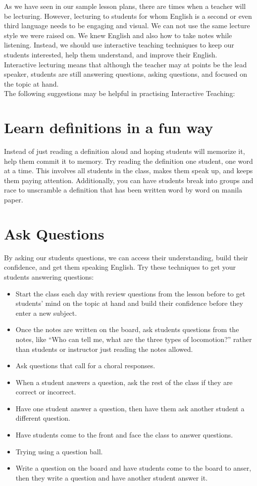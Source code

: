 As we have seen in our sample lesson plans, there are times when a teacher will be lecturing.  However, lecturing to students for whom English is a second or even third language needs to be engaging and visual.  We can not use the same lecture style we were raised on. We knew English and also how to take notes while listening. Instead, we should use interactive teaching techniques to keep our students interested, help them  understand, and improve their English. \\

Interactive lecturing means that although the teacher may at points be the lead speaker, students are still answering questions, asking questions, and focused on the topic at hand.\\

The following suggestions may be helpful in practising Interactive Teaching:

\section{Learn definitions in a fun way}
Instead of just reading a definition aloud and hoping students will memorize it, help them commit it to memory.  Try reading the definition one student, one word at a time.  This involves all students in the class, makes them speak up, and keeps them paying attention.  Additionally, you can have students break into groups and race to unscramble a definition that has been written word by word on manila paper.\\

\section{Ask Questions}
By asking our students questions, we can access their understanding, build their confidence, and get them speaking English. Try these techniques to get your students answering questions:
\begin{itemize}
\item Start the class each day with review questions from the lesson before to get students' mind on the topic at hand and build their confidence before they enter a new subject.
\item Once the notes are written on the board, ask students questions from the notes, like ``Who can tell me, what are the three types of locomotion?'' rather than students or instructor just reading the notes allowed.
\item Ask questions that call for a choral responses.
\item When a student answers a question, ask the rest of the class if they are correct or incorrect.
\item Have one student answer a question, then have them ask another student a different question.
\item Have students come to the front and face the class to answer questions.
\item Trying using a question ball.
\item Write a question on the board and have students come to the board to anser, then they write a question and have another student answer it.
\end{itemize}

